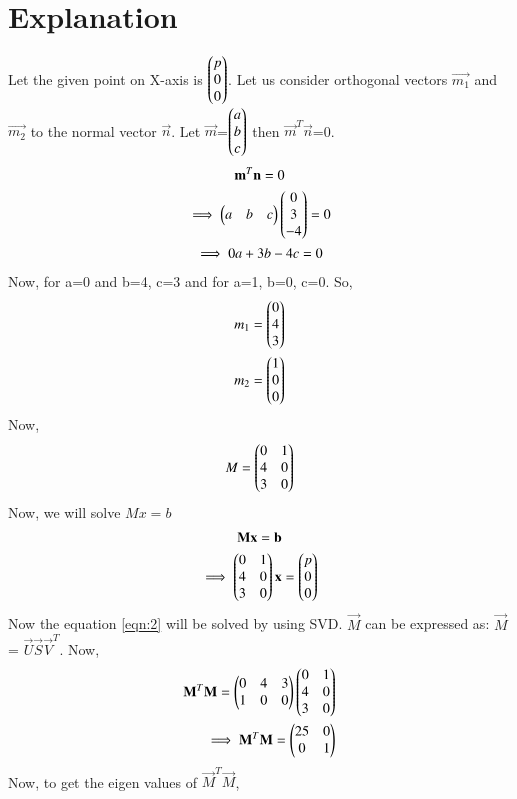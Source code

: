 \documentclass[journal,12pt,twocolumn]{IEEEtran}
\begin{document}
\section{Explanation}
Let the given point on X-axis is $\begin{pmatrix}p\\0\\0\end{pmatrix}$. Let us consider orthogonal vectors $\vec{m_1}$ and $\vec{m_2}$ to the normal vector $\vec{n}$.
Let $\vec{m}$=$\begin{pmatrix}a\\b\\c\end{pmatrix}$ then $\vec{m}^T \vec{n}$=0.
\begin{multline}
\mathbf{m}^T \mathbf{n} = 0\\
\implies \begin{pmatrix}a&b&c\end{pmatrix} \begin{pmatrix}0\\3\\-4\end{pmatrix} = 0\\
\implies 0 a + 3b -4c = 0
\end{multline}
Now, for a=0 and b=4, c=3 and for a=1, b=0, c=0. So,
\begin{align}
m_1 = \begin{pmatrix}0\\4\\3\end{pmatrix}\\
m_2 = \begin{pmatrix}1\\0\\0\end{pmatrix}
\end{align}
Now,
\begin{align}
M = \begin{pmatrix}0 & 1\\4 & 0\\3 & 0\end{pmatrix}
\end{align}
Now, we will solve $Mx=b$
\begin{multline}
\mathbf{M}\mathbf{x}=\mathbf{b}\\
\implies \begin{pmatrix}0 & 1\\4 & 0\\3 & 0\end{pmatrix}\mathbf{x}= \begin{pmatrix}p\\0\\0\end{pmatrix}
\label{eqn:2}
\end{multline}
Now the equation \ref{eqn:2} will be solved by using SVD.
$\vec{M}$ can be expressed as: $\vec{M}$ = $\vec{U} \vec{S} \vec{V}^T$.
Now, 
\begin{align}
\mathbf{M}^T \mathbf{M} = \begin{pmatrix}0& 4& 3\\1 & 0 & 0\end{pmatrix} \begin{pmatrix}0 & 1\\4 & 0\\3 & 0\end{pmatrix}\\
\implies \mathbf{M}^T \mathbf{M} = \begin{pmatrix}25 & 0\\0 & 1\end{pmatrix}
\end{align}
Now, to get the eigen values of $\vec{M}^T \vec{M}$,
\end{document}
